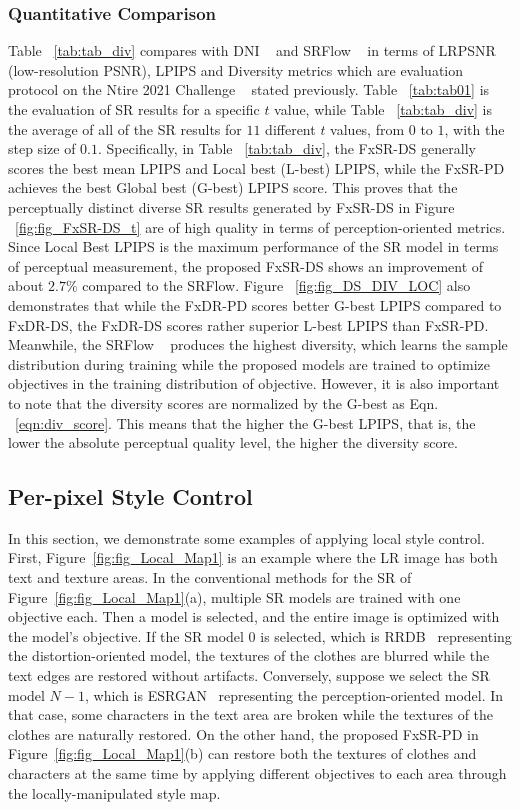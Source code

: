 \documentclass{article}
\begin{document}
\subsubsection{Quantitative Comparison}
Table ~\ref{tab:tab_div} compares with DNI ~\cite{wang2019deep} and SRFlow ~\cite{2020srflow} in terms of LRPSNR (low-resolution PSNR), LPIPS and Diversity metrics which are evaluation protocol on the Ntire 2021 Challenge ~\cite{SRSpace2021, Lugmayr_2021_CVPR} stated previously. Table ~\ref{tab:tab01} is the evaluation of SR results for a specific $t$ value, while Table ~\ref{tab:tab_div} is the average of all of the SR results for $11$ different $t$ values, from $0$ to $1$, with the step size of $0.1$. Specifically, in Table ~\ref{tab:tab_div}, the FxSR-DS generally scores the best mean LPIPS and Local best (L-best) LPIPS, while the FxSR-PD achieves the best Global best (G-best) LPIPS score. This proves that the perceptually distinct diverse SR results generated by FxSR-DS in Figure ~\ref{fig:fig_FxSR-DS_t} are of high quality in terms of perception-oriented metrics. Since Local Best LPIPS is the maximum performance of the SR model in terms of perceptual measurement, the proposed FxSR-DS shows an improvement of about $2.7\%$ compared to the SRFlow. Figure ~\ref{fig:fig_DS_DIV_LOC} also demonstrates that while the FxDR-PD scores better G-best LPIPS compared to FxDR-DS, the FxDR-DS scores rather superior L-best LPIPS than FxSR-PD. Meanwhile, the SRFlow ~\cite{2020srflow} produces the highest diversity, which learns the sample distribution during training while the proposed models are trained to optimize objectives in the training distribution of objective. However, it is also important to note that the diversity scores are normalized by the G-best as Eqn. ~\ref{eqn:div_score}. This means that the higher the G-best LPIPS, that is, the lower the absolute perceptual quality level, the higher the diversity score.
 
\subsection{Per-pixel Style Control}
In this section, we demonstrate some examples of applying local style control. First, Figure~\ref{fig:fig_Local_Map1} is an example where the LR image has both text and texture areas. In the conventional methods for the SR of Figure~\ref{fig:fig_Local_Map1}(a), multiple SR models are trained with one objective each. Then a model is selected, and the entire image is optimized with the model's objective. If the SR model 0 is selected, which is RRDB~\cite{2018esrgan} representing the distortion-oriented model, the textures of the clothes are blurred while the text edges are restored without artifacts. Conversely, suppose we select the SR model $N-1$, which is ESRGAN~\cite{2018esrgan} representing the perception-oriented model. In that case, some characters in the text area are broken while the textures of the clothes are naturally restored. On the other hand, the proposed FxSR-PD in Figure~\ref{fig:fig_Local_Map1}(b) can restore both the textures of clothes and characters at the same time by applying different objectives to each area through the locally-manipulated style map.
\end{document}
